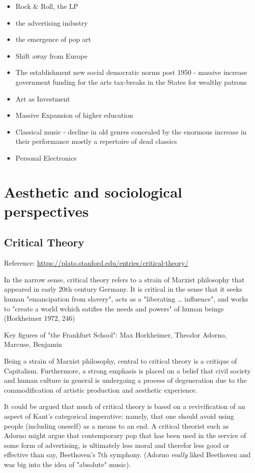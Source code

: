 \documentclass[11pt]{article}
\begin{document}
\begin{itemize}
\item Rock \& Roll, the LP
\item the advertising industry
\item the emergence of pop art
\item Shift away from Europe
\item The establishment new social democratic norms post 1950 - massive increase government funding for the arts tax-breaks in the States for wealthy patrons
\item Art as Investment
\item Massive Expansion of higher education
\item Classical music - decline in old genres concealed by the enormous increase in their performance mostly a repertoire of dead classics
\item Personal Electronics
\end{itemize}


\section{Aesthetic and sociological perspectives}
\label{sec:orge572fd4}
\subsection{Critical Theory}
\label{sec:org9d369a6}

Reference: \url{https://plato.stanford.edu/entries/critical-theory/}

In the narrow sense, critical theory refers to a strain of Marxist
philosophy that appeared in early 20th century Germany. It is critical
in the sense that it seeks human "emancipation from slavery", acts as
a "liberating \ldots{} influence", and works to "create a world wchich
satifies the needs and powers" of human beings (Horkheimer 1972, 246)

Key figures of "the Frankfurt School": Max Horkheimer, Theodor Adorno,
Marcuse, Benjamin

Being a strain of Marxist philosophy, central to critical theory is a
critique of Capitalism. Furthermore, a strong emphasis is placed on a
belief that civil society and human culture in general is undergoing a
process of degeneration due to the commodification of artistic
production and aesthetic experience. 

It could be argued that much of critical theory is based on a
revivification of an aspect of Kant's categorical imperative: namely,
that one should avoid using people (including oneself) as a means to
an end. A critical theorist such as Adorno might argue that
contemporary pop that has been used in the service of some form of
advertising, is ultimately less moral and therefor less good or
effective than say, Beethoven's 7th symphony. (Adorno \emph{really} liked
Beethoven and was big into the idea of "absolute" music).
\end{document}
